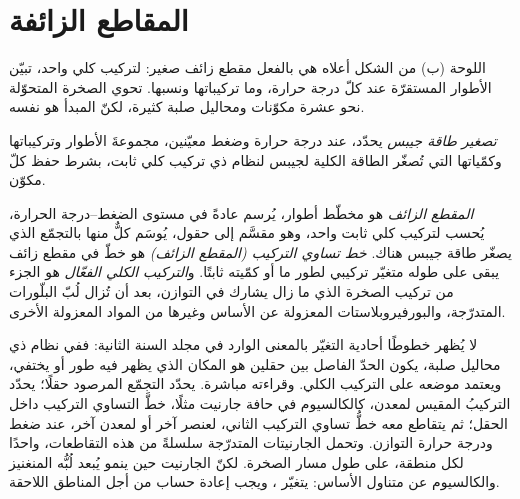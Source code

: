 \section{المقاطع الزائفة}\label{sec:b3:petrological-thermodynamics:pseudosections}

اللوحة (ب) من الشكل أعلاه هي بالفعل مقطع زائف صغير: لتركيب كلي واحد،
تبيّن الأطوار المستقرّة عند كلّ درجة حرارة، وما
تركيباتها ونسبها. تحوي الصخرة المتحوّلة نحو عشرة مكوّنات ومحاليل صلبة كثيرة،
لكنّ المبدأ هو نفسه.

\begin{definition}\label{def:b3:petrological-thermodynamics:minimisation}
\emph{تصغير طاقة جيبس} يحدّد، عند درجة حرارة
وضغط معيّنين، مجموعةَ الأطوار وتركيباتها
وكمّياتها التي تُصغّر الطاقة الكلية لجيبس لنظام ذي تركيب كلي ثابت،
بشرط حفظ كلّ مكوّن.
\end{definition}

\begin{definition}\label{def:b3:petrological-thermodynamics:pseudosection}
\emph{المقطع الزائف} هو مخطّط أطوار، يُرسم عادةً في
مستوى الضغط--درجة الحرارة، يُحسب لتركيب كلي ثابت واحد، وهو مقسَّم
إلى حقول، يُوسَم كلٌّ منها بالتجمّع الذي يصغّر
طاقة جيبس هناك. \emph{خط تساوي التركيب (المقطع الزائف)} هو خطّ في مقطع زائف
يبقى على طوله متغيّر تركيبي
لطور ما أو كمّيته ثابتًا. و\emph{التركيب الكلي
الفعّال} هو الجزء من تركيب الصخرة
الذي ما زال يشارك في التوازن، بعد أن تُزال لُبّ البلّورات المتدرّجة،
والبورفيروبلاستات المعزولة عن الأساس وغيرها من المواد المعزولة
الأخرى.
\end{definition}

لا يُظهر  خطوطًا أحادية التغيّر بالمعنى الوارد في مجلد
السنة الثانية: ففي نظام ذي محاليل صلبة، يكون الحدّ الفاصل بين حقلين
هو المكان الذي يظهر فيه طور أو يختفي، ويعتمد موضعه على التركيب
الكلي. وقراءته مباشرة. يحدّد التجمّع المرصود حقلًا؛
يحدّد التركيبُ المقيس لمعدن، كالكالسيوم في حافة جارنيت
مثلًا، خطَّ التساوي التركيب داخل الحقل؛ ثم يتقاطع معه خطُّ تساوي التركيب الثاني، لعنصر
آخر أو لمعدن آخر، عند ضغط ودرجة حرارة
التوازن. وتحمل الجارنيتات المتدرّجة سلسلةً من هذه التقاطعات، واحدًا لكل
منطقة، على طول مسار الصخرة. لكنّ الجارنيت حين ينمو يُبعد لُبُّه
المنغنيز والكالسيوم عن متناول الأساس: يتغيّر ،
ويجب إعادة حساب  من أجل
المناطق اللاحقة.

